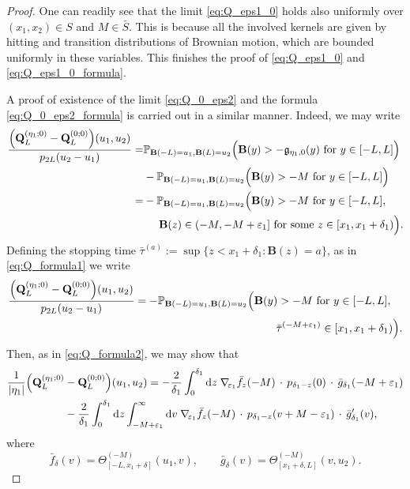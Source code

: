 \documentclass[oneside,final,11pt]{amsart}
\theoremstyle{definition}
\newcommand{\fg}{\mathfrak{g}}
\renewcommand{\d}{\mathrm{d}}
\newcommand{\1}[1]{\mathbf{1}_{#1}}
\newcommand{\eps}{\varepsilon}
\newcommand{\fx}{x}
\newcommand{\fM}{M}
\newcommand{\fB}{\mathbf{B}}
\newcommand{\fQ}{\mathbf{Q}}
\renewcommand{\P}{\mathbb P}
\numberwithin{equation}{section}
\begin{document}
\begin{proof}
One can readily see that the limit \eqref{eq:Q_eps1_0} holds also uniformly over $(x_1, x_2) \in S$ and $M \in \bar S$. This is because all the involved kernels are given by hitting and transition distributions of Brownian motion, which are bounded uniformly in these variables. This finishes the proof of \eqref{eq:Q_eps1_0} and \eqref{eq:Q_eps1_0_formula}.
\smallskip

A proof of existence of the limit \eqref{eq:Q_0_eps2} and the formula \eqref{eq:Q_0_eps2_formula} is carried out in a similar manner. Indeed, we may write
\begin{align}
\frac{\Bigl(\fQ_L^{(\eta_1; 0)} - \fQ_L^{(0; 0)}\Bigr)(u_1, u_2)}{p_{2 L}(u_2 - u_1)} =& \P_{\fB(-L)=u_1, \fB(L) = u_2}\Bigl(\fB(y)>-\fg_{\eta_1, 0}(y) \text{ for } y \in [-L,L]\Bigr) \\
&- \P_{\fB(-L)=u_1, \fB(L) = u_2}\Bigl(\fB(y)>-\fM \text{ for } y \in [-L,L]\Bigr)\\
=& - \P_{\fB(-L)=u_1, \fB(L) = u_2}\Bigl(\fB(y)>-\fM \text{ for } y \in [-L,L],\, \\
& \hspace{0.5cm} \fB(z) \in (-\fM, -\fM + \eps_1] \text{ for some } z \in [\fx_1, \fx_1 + \delta_1)\Bigr).
\end{align}
Defining the stopping time $\bar{\tau}^{(a)} := \sup \{z < x_1 + \delta_1: \fB(z) = a\}$, as in \eqref{eq:Q_formula1} we write
\begin{align}
\frac{\Bigl(\fQ_L^{(\eta_1; 0)} - \fQ_L^{(0; 0)}\Bigr)(u_1, u_2)}{p_{2 L}(u_2 - u_1)}
&= - \P_{\fB(-L)=u_1, \fB(L)=u_2}\Bigl(\fB(y)>-M \text{ for } y \in [-L,L],\, \\
& \hspace{4.5cm} \bar{\tau}^{(-\fM + \eps_1)} \in [\fx_1, \fx_1 + \delta_1)\Bigr).\label{eq:Q2_stopping_time}
\end{align}
Then, as in \eqref{eq:Q_formula2}, we may show that
\begin{align}
	\frac{1}{|\eta_1|} \Bigl(\fQ_L^{(\eta_1; 0)} &- \fQ_L^{(0; 0)}\Bigr)(u_1, u_2) = - \frac{2}{\delta_1} \int_{0}^{\delta_1} \d z\; \nabla_{\!\eps_1} \bar{f}_z(-M) \,\cdot\, p_{\delta_1 - z}(0) \,\cdot\, \bar{g}_{\delta_1}(-M + \eps_1)\\
	&- \frac{2}{\delta_1} \int_{0}^{\delta_1} \d z \int_{-M + \eps_1}^{\infty} \d v\; \nabla_{\!\eps_1} \bar{f}_z(-M) \,\cdot\, p_{\delta_1 - z}(v + M - \eps_1) \,\cdot\, \bar{g}'_{\delta_1}(v),
\end{align}
where
\begin{equation}
	\bar{f}_\delta(v) = \Theta^{(-\fM)}_{[-L, x_1 + \delta]} (u_1, v), \qquad \bar{g}_{\delta}(v) = \Theta^{(-\fM)}_{[x_1 + \delta, L]} (v, u_2).

\end{equation}
\end{proof}
\end{document}
